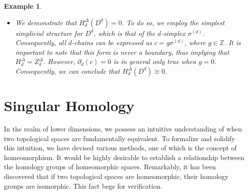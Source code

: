 \documentclass{amsart}
\newtheorem{example}[definition]{Example}
\begin{document}
\begin{example}
\begin{itemize}
	\begin{equation}
	\label{chain}
	c = \sum_{i=0}^{d+1}g_i (v_0,\ldots,v_{i-1},v_{i+1},\ldots,v_d),
	\end{equation}
	where $g_i \in \mathbb{Z}$. Since $\sigma^{(d+1)}$ itself is not part of the structure, there are no boundaries in $Z^\Delta_d$, the group of simplicial cycles. Therefore, $H^\Delta_d = Z^\Delta_d/B^\Delta_d$ represents the group of simplicial cycles. If $c \in Z^\Delta_d$, then $\partial_{d+1}(c) = 0$. By using Eq. \ref{chain}, we have:
	\begin{align} \partial_{d+1}(c) = &\partial_{d+1}\left(\sum_{i=0}^{d+1} g_i(v_0,\ldots,v_{i-1},v_{i+1},\ldots,v_d) \right) \\ = &\sum_{i=0}^{d+1}g_i \big(\sum_{j1}^{d+1}(-1)^j(v_0,\ldots,v_{i-1},v_{i+1},\ldots,v_{j-1},v_{j+1},\ldots,v_d)\big). \end{align}
	By rearranging this sum, we obtain terms of the form:
	\begin{equation} \label{terms} (g_k-g_l)(v_0,\ldots,v_{j-1},v_{j+1},\ldots,v_{i-1},v_{i+1},\ldots,v_d) \end{equation}
	where $k,l = 0, \ldots, d+1$ for all $i,j = 0, \ldots, d$. Each pair of $d$-simplices of $\sigma^{(d+1)}$ intersect along a $(d-1)$-face. Therefore, we obtain terms of the form given in Eq. \ref{terms} for each of these faces. From this, we can deduce that if $\partial_{d}(c) = 0$, we must have $g_k = g_l$ for all $k,l = 0, \ldots, d+1$. In other words, $g_0 = g_1 = \cdots = g_{d+1}$. Consequently, our original $d$-chain can be rewritten as:
	\begin{equation} c = \sum_{i=0}^{n+1}g_0(v_0,\ldots,v_{i-1},v_{i+1},\ldots,v_d), \end{equation}
	allowing us to choose $g_0$ from $\mathbb{Z}$. Thus, we conclude that $H^\Delta_d(S^d) \cong \mathbb{Z}$.
	\item We demonstrate that $H^\Delta_d(D^d) = 0$. To do so, we employ the simplest simplicial structure for $D^d$, which is that of the $d$-simplex $\sigma^{(d)}$. Consequently, all $d$-chains can be expressed as $c = g \sigma^{(d)}$, where $g \in \mathbb{Z}$. It is important to note that this form is never a boundary, thus implying that $H^\Delta_d = Z^\Delta_d$. However, $\partial_d(c) = 0$ is in general only true when $g = 0$. Consequently, we can conclude that $H^\Delta_d(D^d) \cong 0$.
\end{itemize}
\end{example}

\section{Singular Homology}
In the realm of lower dimensions, we possess an intuitive understanding of when two topological spaces are fundamentally \glqq equivalent\grqq{}. To formalize and solidify this intuition, we have devised various methods, one of which is the concept of homeomorphism. It would be highly desirable to establish a relationship between the homology groups of homeomorphic spaces. Remarkably, it has been discovered that if two topological spaces are homeomorphic, their homology groups are isomorphic. This fact begs for verification.
\end{document}
